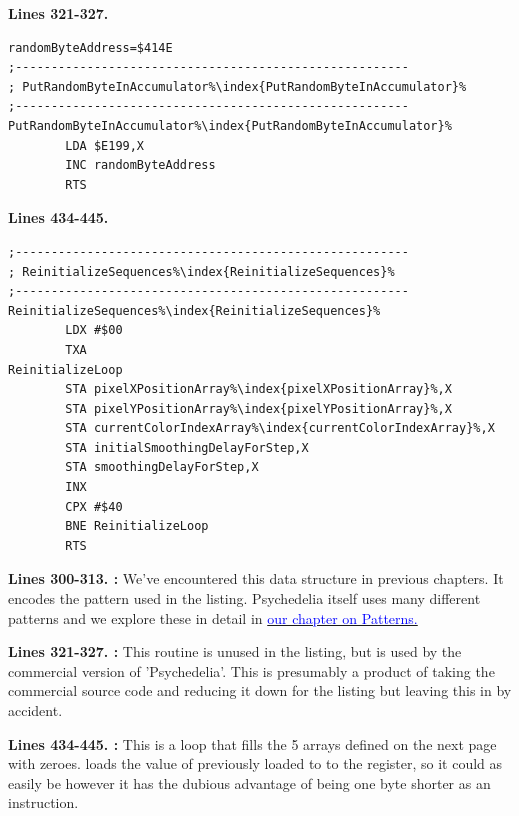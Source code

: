 \textbf{Lines 321-327. }
\begin{lstlisting}[caption= Random\, unused\, feels like a metaphor.,escapechar=\%]
randomByteAddress=$414E
;-------------------------------------------------------
; PutRandomByteInAccumulator%\index{PutRandomByteInAccumulator}%
;-------------------------------------------------------
PutRandomByteInAccumulator%\index{PutRandomByteInAccumulator}%   
        LDA $E199,X
        INC randomByteAddress
        RTS 
\end{lstlisting}
\textbf{Lines 434-445. }
\begin{lstlisting}[caption = Fill our pixel arrays with zeros.,escapechar=\%]
;-------------------------------------------------------
; ReinitializeSequences%\index{ReinitializeSequences}%
;-------------------------------------------------------
ReinitializeSequences%\index{ReinitializeSequences}%   
        LDX #$00
        TXA 
ReinitializeLoop   
        STA pixelXPositionArray%\index{pixelXPositionArray}%,X
        STA pixelYPositionArray%\index{pixelYPositionArray}%,X
        STA currentColorIndexArray%\index{currentColorIndexArray}%,X
        STA initialSmoothingDelayForStep,X
        STA smoothingDelayForStep,X
        INX 
        CPX #$40
        BNE ReinitializeLoop
        RTS 

\end{lstlisting}
\clearpage

\textbf{Lines 300-313. :} We've encountered this data structure in previous chapters. It encodes the pattern used in the listing.
Psychedelia itself uses many different patterns and we explore these in detail in
\hyperref[sec:patterns]{\textcolor{blue}{our chapter on Patterns.}} 

\bigskip
\bigskip
\bigskip
\bigskip
\bigskip
\bigskip
\bigskip
\bigskip
\bigskip
\bigskip
\bigskip
\bigskip
\bigskip
\textbf{Lines 321-327. :} This routine is unused in the listing, but is used by the commercial version of 'Psychedelia'. This is
presumably a product of taking the commercial source code and reducing it down for the listing but 
leaving this in by accident.

\bigskip
\bigskip
\bigskip
\bigskip
\bigskip
\bigskip
\bigskip
\textbf{Lines 434-445. :} This is a loop that fills the 5 arrays defined on the next page with zeroes.
 loads the value of  previously loaded to  to the  register, so it could as easily be 
however it has the dubious advantage of being one byte shorter as an instruction.


